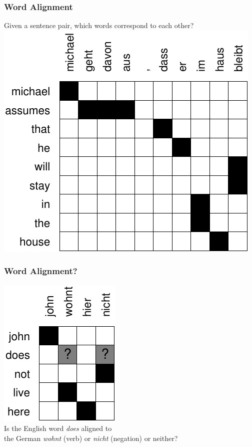 

\begin{frame}
\frametitle{Word Alignment\koehnref}
\vspace{5mm}
\begin{center}
Given a sentence pair, which words correspond to each other?\\[5mm]
\includegraphics[scale=.8]{figures/michael-alignment.pdf}
\end{center}
\end{frame}


\begin{frame}
\frametitle{Word Alignment?\koehnref}
\vspace{10mm}
\begin{center}
\includegraphics[scale=1.1]{figures/does-not-alignment.pdf}\\[5mm]
Is the English word \textit{does} aligned to\\ the German \textit{wohnt} (verb) or \textit{nicht} (negation) or neither?
\end{center}

\end{frame}


